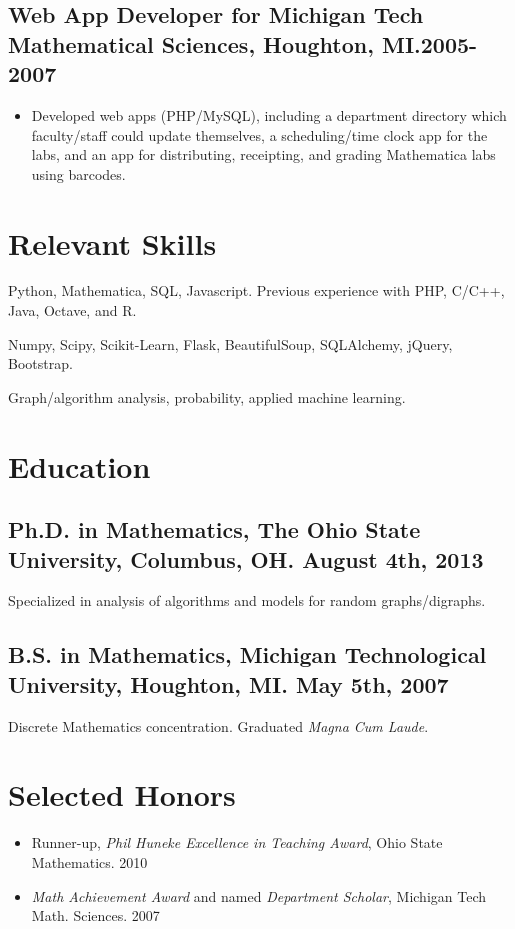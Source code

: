 \documentclass[11pt]{article}
\begin{document}
\subsection{Web App Developer for Michigan Tech Mathematical Sciences{\normalfont, Houghton, MI.\hfill 2005-2007}}
\begin{itemize}
\item Developed web apps (PHP/MySQL), including a department directory which faculty/staff could update themselves, a scheduling/time clock app for the labs, and an app for distributing, receipting, and grading Mathematica labs using barcodes.
\end{itemize}

\section{Relevant Skills}
\begin{description}[font=\bfseries, align=left, itemindent=0pt, labelsep=2pt, leftmargin=1in, labelwidth=!, topsep=0em]
\item[Languages:] Python, Mathematica, SQL, Javascript. Previous experience with PHP, C/C++, Java, Octave, and R.
\item[Tools:] Numpy, Scipy, Scikit-Learn, Flask, BeautifulSoup, SQLAlchemy, jQuery, Bootstrap.
\item[Other Skills:] Graph/algorithm analysis, probability, applied machine learning.
\end{description}

\section{Education}
\subsection{Ph.D. in Mathematics, The Ohio State University{\normalfont, Columbus, OH. \hfill August 4th, 2013}}
Specialized in analysis of algorithms and models for random graphs/digraphs.

\subsection{B.S. in Mathematics,  Michigan Technological University{\normalfont, Houghton, MI. \hfill May 5th, 2007}}
Discrete Mathematics concentration.  Graduated {\em Magna Cum Laude}. 
\section{Selected Honors}
\begin{itemize}
\item Runner-up, {\em Phil Huneke Excellence in Teaching Award}, Ohio State Mathematics. \hfill 2010
\item {\em Math Achievement Award} and named {\em Department Scholar}, Michigan Tech Math. Sciences. \hfill 2007
\end{itemize}
\end{document}
